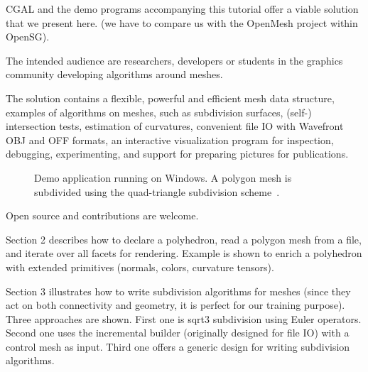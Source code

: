 CGAL and the demo programs accompanying this tutorial offer a viable
solution that we present here. (we have to compare us with the
OpenMesh project within OpenSG).


The intended audience are researchers, developers or students in the
graphics community developing algorithms around meshes.


The solution contains a flexible, powerful and efficient mesh data
structure, examples of algorithms on meshes, such as subdivision
surfaces, (self-) intersection tests, estimation of curvatures,
convenient file IO with Wavefront OBJ and OFF formats, an interactive
visualization program for inspection, debugging, experimenting, and
support for preparing pictures for publications.

\begin{figure}[htb]
    \caption{Demo application running on Windows. A polygon mesh is 
             subdivided using the quad-triangle subdivision 
             scheme~\cite{sl-qts-02}.}
    \label{fig:teaser}
\end{figure}




Open source and contributions are welcome. 




Section 2 describes how to declare a polyhedron, read a polygon mesh
from a file, and iterate over all facets for rendering. Example is
shown to enrich a polyhedron with extended primitives (normals,
colors, curvature tensors).

Section 3 illustrates how to write subdivision algorithms for meshes
(since they act on both connectivity and geometry, it is perfect for
our training purpose). Three approaches are shown. First one is sqrt3
subdivision using Euler operators. Second one uses the incremental
builder (originally designed for file IO) with a control mesh as
input. Third one offers a generic design for writing subdivision
algorithms.





